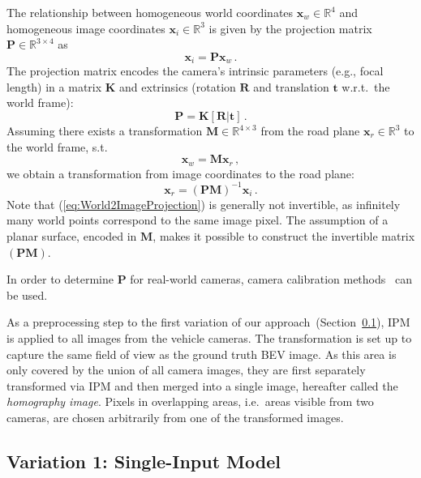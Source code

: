 \documentclass[a4paper, 10pt, conference]{ieeeconf}
\newcommand{\eq}[1]{(\ref{#1})}
\newcommand{\sect}[1]{Section~\ref{#1}}
\newcommand{\vect}[1]{\boldsymbol{#1}}
\newcommand{\mat}[1]{\mathbf{#1}}
\begin{document}
The relationship between homogeneous world coordinates \( \vect{x}_w \in \mathbb{R}^4 \) and homogeneous image coordinates \( \vect{x}_i \in \mathbb{R}^3 \) is given by the projection matrix \( \mat{P} \in \mathbb{R}^{3 \times 4} \) as
\begin{equation}
  \vect{x}_i = \mat{P} \vect{x}_w \,.
  \label{eq:World2ImageProjection}
\end{equation}
The projection matrix encodes the camera's intrinsic parameters (e.g., focal length) in a matrix \( \mat{K} \) and extrinsics (rotation \( \mat{R} \) and translation \( \vect{t} \) w.r.t.\ the world frame):
\begin{equation}
  \mat{P} = \mat{K} \left[ \mat{R} \vert \vect{t} \right] \,.
  \label{eq:ProjectionMatrix}
\end{equation}
Assuming there exists a transformation \( \mat{M} \in \mathbb{R}^{4 \times 3} \) from the road plane \( \vect{x}_r \in \mathbb{R}^3 \) to the world frame, s.t.\
\begin{equation}
  \vect{x}_w = \mat{M} \vect{x}_r \,,
  \label{eq:Road2WorldProjection}
\end{equation}
we obtain a transformation from image coordinates to the road plane:
\begin{equation}
  \vect{x}_r = \left( \mat{P} \mat{M} \right)^{-1} \vect{x}_i \,.
\end{equation}
Note that \eq{eq:World2ImageProjection} is generally not invertible, as infinitely many world points correspond to the same image pixel. The assumption of a planar surface, encoded in \( \mat{M} \), makes it possible to construct the invertible matrix \( \left( \mat{P} \mat{M} \right) \).

In order to determine \( \mat{P} \) for real-world cameras, camera calibration methods~\cite{KaehlerBradski_LearningOpenCVComputer_2017} can be used.

As a preprocessing step to the first variation of our approach~(\sect{sec:SingleInputModel}), IPM is applied to all images from the vehicle cameras. The transformation is set up to capture the same field of view as the ground truth BEV image. As this area is only covered by the union of all camera images, they are first separately transformed via IPM and then merged into a single image, hereafter called the \textit{homography image}. Pixels in overlapping areas, i.e.\ areas visible from two cameras, are chosen arbitrarily from one of the transformed images.

\subsection{Variation 1: Single-Input Model}\label{sec:SingleInputModel}
\end{document}
